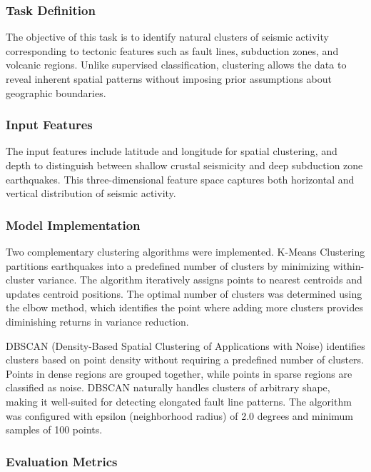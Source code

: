 \subsubsection{Task Definition}

The objective of this task is to identify natural clusters of seismic activity corresponding to tectonic features such as fault lines, subduction zones, and volcanic regions. Unlike supervised classification, clustering allows the data to reveal inherent spatial patterns without imposing prior assumptions about geographic boundaries.

\subsubsection{Input Features}

The input features include latitude and longitude for spatial clustering, and depth to distinguish between shallow crustal seismicity and deep subduction zone earthquakes. This three-dimensional feature space captures both horizontal and vertical distribution of seismic activity.

\subsubsection{Model Implementation}

Two complementary clustering algorithms were implemented. K-Means Clustering partitions earthquakes into a predefined number of clusters by minimizing within-cluster variance. The algorithm iteratively assigns points to nearest centroids and updates centroid positions. The optimal number of clusters was determined using the elbow method, which identifies the point where adding more clusters provides diminishing returns in variance reduction.

DBSCAN (Density-Based Spatial Clustering of Applications with Noise) identifies clusters based on point density without requiring a predefined number of clusters. Points in dense regions are grouped together, while points in sparse regions are classified as noise. DBSCAN naturally handles clusters of arbitrary shape, making it well-suited for detecting elongated fault line patterns. The algorithm was configured with epsilon (neighborhood radius) of 2.0 degrees and minimum samples of 100 points.

\subsubsection{Evaluation Metrics}

